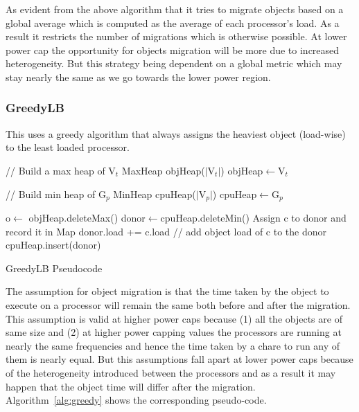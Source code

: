  As evident from the above algorithm that it tries to migrate objects based on
 a global average which is computed as the average of each processor's load.
 As a result it restricts the number of migrations which is otherwise possible.
 At lower power cap  the opportunity for objects migration will be more due to
 increased heterogeneity.  But this strategy being dependent on a global metric
 which may stay nearly the same as we go towards the lower power region.

\subsubsection{GreedyLB}
This uses a greedy algorithm that always assigns the heaviest object (load-wise) to the
least loaded processor. 

\begin{algorithm}

 // Build a max heap of V$_t$ \;
 MaxHeap objHeap($|$V$_t|$)\;
 objHeap$\leftarrow$V$_t$ \; 

 // Build min heap of G$_p$\;
 MinHeap cpuHeap($|$V$_p|$)\;
 cpuHeap$\leftarrow$G$_p$\;  

  {
    o$\leftarrow$ objHeap.deleteMax()\;
    donor$\leftarrow$cpuHeap.deleteMin()\;
    Assign c to donor and record it in Map\;
    donor.load += c.load // add object load of c to the donor\;
    cpuHeap.insert(donor) \;
    }
 \caption{GreedyLB Pseudocode}
 \label{alg:greedy}
\end{algorithm}

The assumption for object migration is that the time taken by the object to
execute on a processor will remain the same both before and after the
migration.  This assumption is valid at higher power caps because (1) all the
objects are of same size and (2) at higher power capping values the processors
are running at nearly the same frequencies and hence the time taken by a chare
to run any of them is nearly equal.  But this assumptions fall apart at lower
power caps because of the heterogeneity introduced between the processors and
as a result it may happen that the object time will differ after the migration.
Algorithm~\ref{alg:greedy} shows the corresponding pseudo-code.

